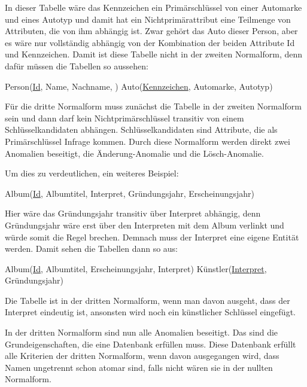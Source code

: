 In dieser Tabelle wäre das Kennzeichen ein Primärschlüssel von einer Automarke und eines Autotyp und damit hat ein Nichtprimärattribut eine Teilmenge von Attributen, die von ihm abhängig ist. Zwar gehört das Auto dieser Person, aber es wäre nur vollständig abhängig von der Kombination der beiden Attribute Id und Kennzeichen. Damit ist diese Tabelle nicht in der zweiten Normalform, denn dafür müssen die Tabellen so aussehen:

\begin{small}
	Person(\uline{Id}, Name, Nachname, )\newline
	Auto(\uline{Kennzeichen}, Automarke, Autotyp)
\end{small}


Für die dritte Normalform muss zunächst die Tabelle in der zweiten Normalform sein und dann darf kein Nichtprimärschlüssel transitiv von einem Schlüsselkandidaten abhängen. Schlüsselkandidaten sind Attribute, die als Primärschlüssel Infrage kommen. Durch diese Normalform werden direkt zwei Anomalien beseitigt, die Änderung-Anomalie und die Lösch-Anomalie. 

Um dies zu verdeutlichen, ein weiteres Beispiel:

\begin{small}
	Album(\uline{Id}, Albumtitel, Interpret, Gründungsjahr, Erscheinungsjahr)
\end{small}


Hier wäre das Gründungsjahr transitiv über Interpret abhängig, denn Gründungsjahr wäre erst über den Interpreten mit dem Album verlinkt und würde somit die Regel brechen. Demnach muss der Interpret eine eigene Entität werden. Damit sehen die Tabellen dann so aus:

\begin{small}
	Album(\uline{Id}, Albumtitel, Erscheinungsjahr, Interpret)\newline
	Künstler(\uline{Interpret}, Gründungsjahr)
\end{small}


Die Tabelle ist in der dritten Normalform, wenn man davon ausgeht, dass der Interpret eindeutig ist, ansonsten wird noch ein künstlicher Schlüssel eingefügt. 

In der dritten Normalform sind nun alle Anomalien beseitigt. Das sind die Grundeigenschaften, die eine Datenbank erfüllen muss. Diese Datenbank erfüllt alle Kriterien der dritten Normalform, wenn davon ausgegangen wird, dass Namen ungetrennt schon atomar sind, falls nicht wären sie in der nullten Normalform.



